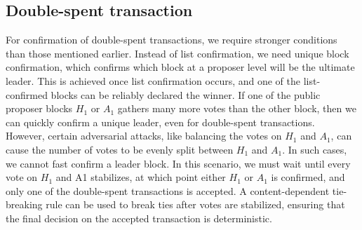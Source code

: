 \subsection{Double-spent transaction}
For confirmation of double-spent transactions, we require stronger conditions than those mentioned earlier. Instead of list confirmation, we need unique block confirmation, which confirms which block at a proposer level will be the ultimate leader. This is achieved once list confirmation occurs, and one of the list-confirmed blocks can be reliably declared the winner. If one of the public proposer blocks $H_{1}$ or $A_{1}$ gathers many more votes than the other block, then we can quickly confirm a unique leader, even for double-spent transactions.\\
However, certain adversarial attacks, like balancing the votes on $H_{1}$ and $A_{1}$, can cause the number of votes to be evenly split between $H_{1}$ and $A_{1}$. In such cases, we cannot fast confirm a leader block. In this scenario, we must wait until every vote on $H_{1}$ and A1 stabilizes, at which point either $H_{1}$ or $A_{1}$ is confirmed, and only one of the double-spent transactions is accepted. A content-dependent tie-breaking rule can be used to break ties after votes are stabilized, ensuring that the final decision on the accepted transaction is deterministic.
